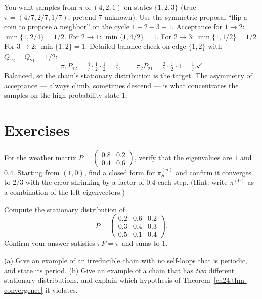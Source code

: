 \begin{example}
\label{ch24:ex-metropolis}
You want samples from $\pi \propto (4, 2, 1)$ on states $\{1,2,3\}$ (true
$\pi = (4/7, 2/7, 1/7)$, pretend $7$ unknown). Use the symmetric proposal ``flip a
coin to propose a neighbor'' on the cycle $1\!-\!2\!-\!3\!-\!1$. Acceptance for
$1\to 2$: $\min\{1, 2/4\} = 1/2$. For $2\to 1$: $\min\{1, 4/2\}=1$. For $2\to 3$:
$\min\{1,1/2\}=1/2$. For $3\to 2$: $\min\{1, 2\}=1$. Detailed balance check on edge
$\{1,2\}$ with $Q_{12}=Q_{21}=1/2$:
\[
  \pi_1 P_{12} = \tfrac47\cdot\tfrac12\cdot\tfrac12 = \tfrac{1}{7},\qquad
  \pi_2 P_{21} = \tfrac27\cdot\tfrac12\cdot 1 = \tfrac{1}{7}. \checkmark
\]
Balanced, so the chain's stationary distribution is the target. The asymmetry of
acceptance --- always climb, sometimes descend --- is what concentrates the
samples on the high-probability state $1$.
\end{example}

\section{Exercises}
\label{ch24:exercises}

\begin{exercise}
For the weather matrix $P=\left(\begin{smallmatrix}0.8 & 0.2\\ 0.4 & 0.6\end{smallmatrix}\right)$,
verify that the eigenvalues are $1$ and $0.4$. Starting from $(1,0)$, find a
closed form for $\pi^{(n)}_S$ and confirm it converges to $2/3$ with the error
shrinking by a factor of $0.4$ each step. (Hint: write $\pi^{(0)}$ as a
combination of the left eigenvectors.)
\end{exercise}

\begin{exercise}
Compute the stationary distribution of
\[
  P = \begin{pmatrix} 0.2 & 0.6 & 0.2 \\ 0.3 & 0.4 & 0.3 \\ 0.5 & 0.1 & 0.4 \end{pmatrix}.
\]
Confirm your answer satisfies $\pi P = \pi$ and sums to $1$.
\end{exercise}

\begin{exercise}
(a) Give an example of an irreducible chain with no self-loops that is periodic,
and state its period. (b) Give an example of a chain that has \emph{two} different
stationary distributions, and explain which hypothesis of
Theorem~\ref{ch24:thm-convergence} it violates.
\end{exercise}

